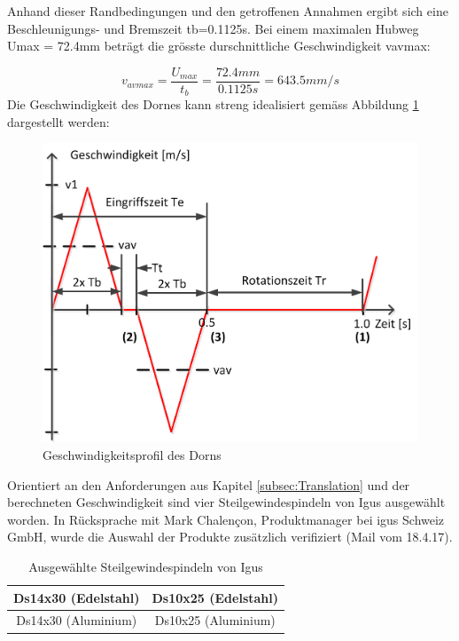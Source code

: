 Anhand dieser Randbedingungen und den getroffenen Annahmen ergibt sich eine Beschleunigungs- und Bremszeit tb=0.1125s. Bei einem maximalen Hubweg Umax = 72.4mm beträgt die grösste durschnittliche Geschwindigkeit vavmax:

\begin{equation}
v_{avmax}=\frac{U_{max}}{t_{b}}=\frac{72.4mm}{0.1125s}=643.5mm/s
\end{equation}
\newline
Die Geschwindigkeit des Dornes kann streng idealisiert gemäss Abbildung \ref{fig:vprofil_dorn} dargestellt werden:
	\begin{figure}[H]
	\includegraphics[width=1\textwidth]{Illustrationen/6-Umsetzung/vprofil_dorn.png}
	\caption{Geschwindigkeitsprofil des Dorns}
	\label{fig:vprofil_dorn}
\end{figure}
Orientiert an den Anforderungen aus Kapitel \ref{subsec:Translation} und der berechneten Geschwindigkeit sind vier Steilgewindespindeln von Igus ausgewählt worden. In Rücksprache mit Mark Chalençon, Produktmanager bei igus Schweiz GmbH, wurde die Auswahl der Produkte zusätzlich verifiziert (Mail vom 18.4.17).
\begin{table}[H]
\begin{tabular}{|c|c|}
	\hline 
	Ds14x30 (Edelstahl) & Ds10x25 (Edelstahl) \\ 
	\hline 
	Ds14x30 (Aluminium) & Ds10x25 (Aluminium) \\ 
	\hline 
\end{tabular} 
\caption{Ausgewählte Steilgewindespindeln von Igus}
\label{tab:spindeln}
\end{table}
